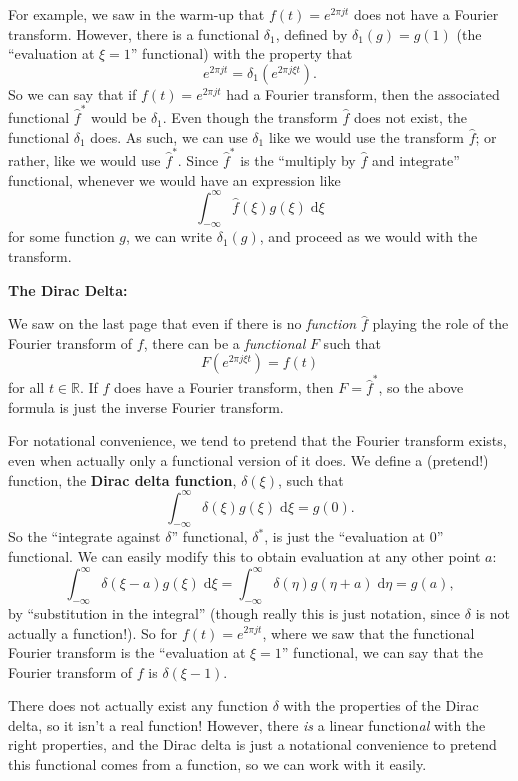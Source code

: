 \documentclass{article}
\newcommand{\diff}{\;\mathrm{d}}
\begin{document}
For example, we saw in the warm-up that $f(t)=e^{2\pi jt}$ does not have a Fourier transform. However, there is a functional $\delta_1$, defined by $\delta_1(g)=g(1)$ (the ``evaluation at $\xi=1$'' functional) with the property that
\[e^{2\pi jt}=\delta_1\left(e^{2\pi j\xi t}\right).\]
So we can say that if $f(t)=e^{2\pi jt}$ had a Fourier transform, then the associated functional $\hat{f}^*$ would be $\delta_1$. Even though the transform $\hat{f}$ does not exist, the functional $\delta_1$ does. As such, we can use $\delta_1$ like we would use the transform $\hat{f}$; or rather, like we would use $\hat{f}^*$. Since $\hat{f}^*$ is the ``multiply by $\hat{f}$ and integrate'' functional, whenever we would have an expression like
\[\int_{-\infty}^\infty \hat{f}(\xi)g(\xi)\diff \xi\]
for some function $g$, we can write $\delta_1(g)$, and proceed as we would with the transform.



\clearpage



\textbf{The Dirac Delta:}\bigskip

We saw on the last page that even if there is no \textit{function} $\hat{f}$ playing the role of the Fourier transform of $f$, there can be a \textit{functional} $F$ such that
\[F\left(e^{2\pi j\xi t}\right)=f(t)\]
for all $t\in\mathbb{R}$. If $f$ does have a Fourier transform, then $F=\hat{f}^*$, so the above formula is just the inverse Fourier transform.

For notational convenience, we tend to pretend that the Fourier transform exists, even when actually only a functional version of it does. We define a (pretend!) function, the \textbf{Dirac delta function}, $\delta(\xi)$, such that
\[\int_{-\infty}^\infty \delta(\xi)g(\xi)\diff \xi=g(0).\]
So the ``integrate against $\delta$'' functional, $\delta^*$, is just the ``evaluation at 0'' functional. We can easily modify this to obtain evaluation at any other point $a$:
\[\int_{-\infty}^\infty \delta(\xi-a)g(\xi)\diff \xi = \int_{-\infty}^\infty \delta(\eta)g(\eta+a)\diff \eta=g(a),\]
by ``substitution in the integral'' (though really this is just notation, since $\delta$ is not actually a function!). So for $f(t)=e^{2\pi jt}$, where we saw that the functional Fourier transform is the ``evaluation at $\xi=1$'' functional, we can say that the Fourier transform of $f$ is $\delta(\xi-1)$.

There does not actually exist any function $\delta$ with the properties of the Dirac delta, so it isn't a real function! However, there \textit{is} a linear function\textit{al} with the right properties, and the Dirac delta is just a notational convenience to pretend this functional comes from a function, so we can work with it easily.\bigskip
\end{document}

